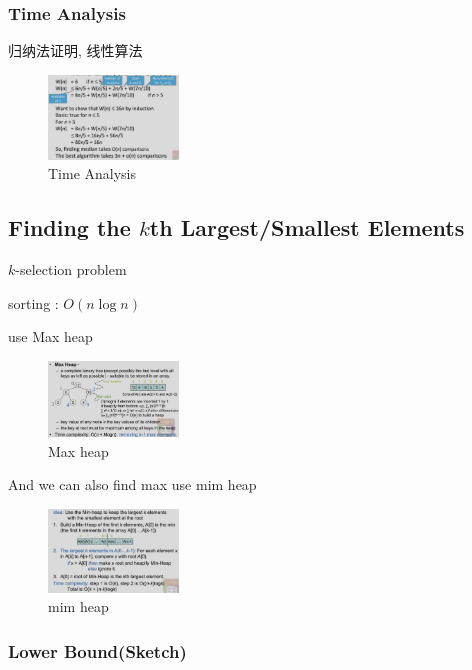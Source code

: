 \subsubsection{Time Analysis}
归纳法证明, 线性算法

\begin{figure}[H]
    \centering
    \includegraphics[width=0.309\textwidth]{pic/DAA3/Time Analysis}
    \caption{Time Analysis}
\end{figure}

\subsection{Finding the \texorpdfstring{$k$}.th Largest/Smallest Elements}
$k$-selection problem

sorting : $O(n\log n)$

use Max heap
\begin{figure}[H]
    \centering
    \includegraphics[width=0.309\textwidth]{pic/DAA3/Max heap}
    \caption{Max heap}
\end{figure}

And we can also find max use mim heap

\begin{figure}[H]
    \centering
    \includegraphics[width=0.309\textwidth]{pic/DAA3/mim heap}
    \caption{mim heap}
\end{figure}


\subsubsection{Lower Bound(Sketch)}

